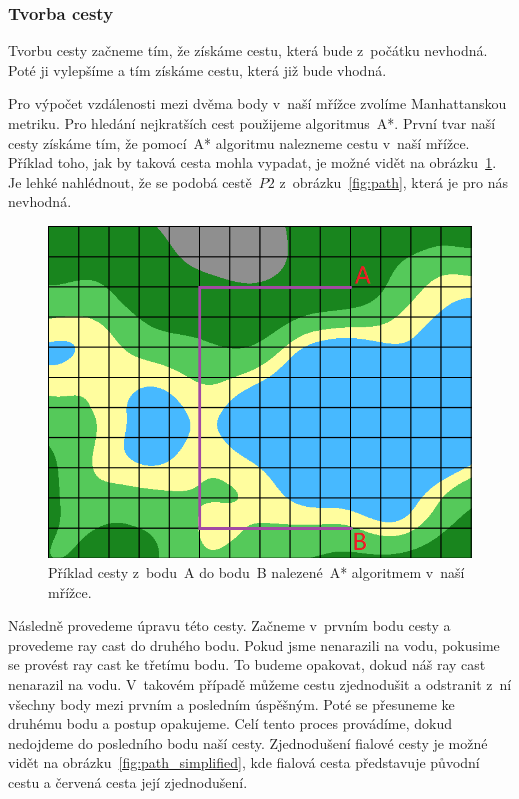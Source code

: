 \subsubsection{Tvorba cesty}
Tvorbu cesty začneme tím, že získáme cestu, která bude z~počátku nevhodná. Poté ji vylepšíme a tím získáme cestu, která již bude vhodná.

Pro výpočet vzdálenosti mezi dvěma body v~naší mřížce zvolíme Manhattanskou metriku. Pro hledání nejkratších cest použijeme algoritmus~A*. První tvar naší cesty získáme tím, že pomocí~A* algoritmu nalezneme cestu v~naší mřížce. Příklad toho, jak by taková cesta mohla vypadat, je možné vidět na obrázku~\ref{fig:path_grid}. Je lehké nahlédnout, že se podobá cestě~$P2$ z~obrázku~\ref{fig:path}, která je pro nás nevhodná.

\begin{figure}[!htb]
    \centering
    \includegraphics[width=0.66\linewidth]{img/path_grid.png}
    \caption{Příklad cesty z~bodu~A do bodu~B nalezené~A* algoritmem v~naší mřížce.}
    \label{fig:path_grid}
\end{figure}

Následně provedeme úpravu této cesty. Začneme v~prvním bodu cesty a provedeme ray cast do druhého bodu. Pokud jsme nenarazili na vodu, pokusime se provést ray cast ke třetímu bodu. To budeme opakovat, dokud náš ray cast nenarazil na vodu. V~takovém případě můžeme cestu zjednodušit a odstranit z~ní všechny body mezi prvním a posledním úspěšným. Poté se přesuneme ke druhému bodu a postup opakujeme. Celí tento proces provádíme, dokud nedojdeme do posledního bodu naší cesty. Zjednodušení fialové cesty je možné vidět na obrázku~\ref{fig:path_simplified}, kde fialová cesta představuje původní cestu a červená cesta její zjednodušení.

